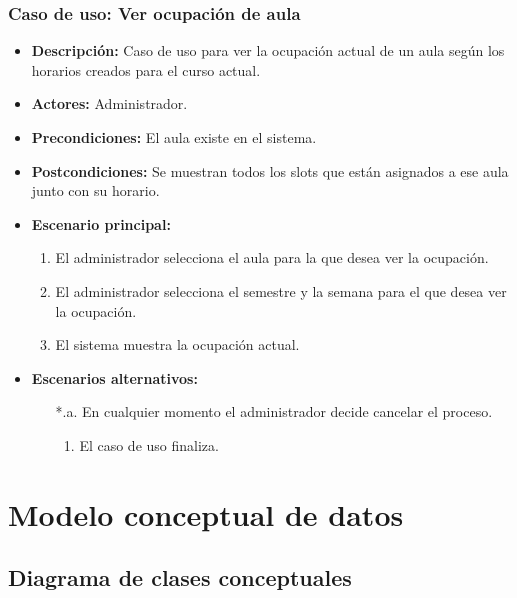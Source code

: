 \documentclass{book}
\begin{document}
\subsubsection*{Caso de uso: Ver ocupación de aula}
\begin{itemize}
\item{\bf Descripción:} Caso de uso para ver la ocupación actual de un aula según los horarios creados para el curso actual.
\item{\bf Actores:} Administrador.
\item{\bf Precondiciones:} El aula existe en el sistema.
\item{\bf Postcondiciones:} Se muestran todos los slots que están asignados a ese aula junto con su horario.
\item{\bf Escenario principal:}
	\begin{enumerate}
	\item El administrador selecciona el aula para la que desea ver la ocupación.
	\item El administrador selecciona el semestre y la semana para el que desea ver la ocupación.
	\item El sistema muestra la ocupación actual.
	\end{enumerate}
\item{\bf Escenarios alternativos:}
	\begin{itemize}
		\item[*.a.] En cualquier momento el administrador decide cancelar el proceso.
		\begin{enumerate}
			\item El caso de uso finaliza.
		\end{enumerate}
	\end{itemize}
\end{itemize}

\section{Modelo conceptual de datos}

\subsection{Diagrama de clases conceptuales}
\end{document}
